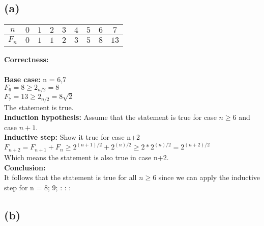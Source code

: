 \documentclass{article}
\begin{document}
\subsection{(a)}
\begin{table}[!hbp]
\LARGE
\begin{center}
\begin{tabular}{*{9}{|c}|}
\hline $n$&$0$&$1$&$2$&$3$&$4$&$5$&$6$&$7$\\
\hline $F_n$&$0$&$1$&$1$&$2$&$3$&$5$&$8$&$13$\\
\hline
\end{tabular}
\end{center}
\end{table}
\textbf{\large Correctness:}\\\\
\textbf{Base case:} n = 6,7\\
$F_6=8 \ge 2_{n/2}=8$\\
$F_7=13 \ge 2_{n/2}=8\sqrt{2}$\\
The statement is true.\\
\textbf{Induction hypothesis:} Assume that the statement is true for case $n\geq 6$ and case $n+1$.\\
\textbf{Inductive step:} Show it true for case n+2\\
$F_{n+2}=F_{n+1}+F_{n} \ge 2^{(n+1)/2}+2^{(n)/2}\ge2*2^{(n)/2}=2^{(n+2)/2}$\\
Which means the statement is also true in case n+2.\\
\textbf{Conclusion:}\\
It follows that the statement is true for all $n\ge 6$ since we can apply the inductive step for n = 8; 9; : : :







\subsection{(b)}
\end{document}
